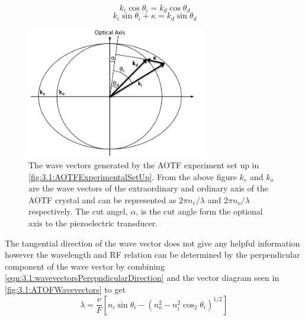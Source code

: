 \begin{equation}
    \ k_{i}\cos\theta_{i} = {k}_{d}\cos\theta_{d}
    \label{eqn:3.1:wavevectorsTangentalDirection}
\end{equation}
\begin{equation}
    \ k_{i}\sin\theta_{i} + \kappa = {k}_{d}\sin\theta_{d}
    \label{eqn:3.1:wavevectorsPerepndicularDirection}
\end{equation}

\begin{figure}[h!]
    \begin{center}
    \includegraphics[width=0.7\textwidth]{./Images/3-1-AOTFWavevectorWithRefraction.pdf}
    \caption[Wave Vectors Generated by an AOTF]{The wave vectors generated by the AOTF experiment set up in \autoref{fig:3.1:AOTFExperimentalSetUp}. From the above figure $k_{e}$ and $k_{o}$ are the wave vectors of the extraordinary and ordinary axis of the AOTF crystal and can be represented as $2\pi n_{e}/\lambda$ and $2\pi n_{o}/\lambda$ respectively. The cut angel, $\alpha$, is the cut angle form the optional axis to the piezoelectric transducer.}
    \label{fig:3.1:ATOFWavevectors}
    \end{center}
\end{figure}

The tangential direction of the wave vector does not give any helpful information however the wavelength and RF relation can be determined by the perpendicular component of the wave vector by combining \autoref{eqn:3.1:wavevectorsPerepndicularDirection} and the vector diagram seen in \autoref{fig:3.1:ATOFWavevectors} to get
\begin{equation}
    \lambda  = \frac{\nu}{F}[n_{i}\sin\theta_{i}-(n_{o}^{2}-n_{i}^{2}\cos_{2}\theta_{i})^{1/2}]
    \label{eqn:3.1:initialAOTFWavelengthDependance}
\end{equation}

